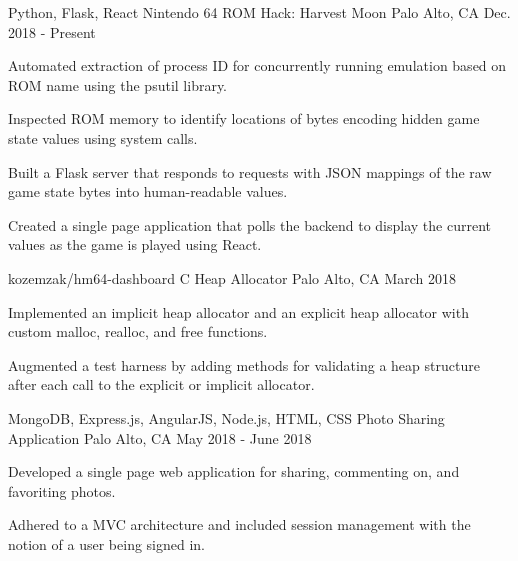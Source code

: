 
\begin{cventries}
  \cvprojectentry
    {Python, Flask, React}
    {Nintendo 64 ROM Hack: Harvest Moon}
    {Palo Alto, CA}
    {Dec. 2018 - Present}
    {
      \begin{cvitems}
        \item{Automated extraction of process ID for concurrently running emulation based on ROM name using the psutil library.}
        \item{Inspected ROM memory to identify locations of bytes encoding hidden game state values using system calls.}
        \item{Built a Flask server that responds to requests with JSON mappings of the raw game state bytes into human-readable values.}
        \item{Created a single page application that polls the backend to display the current values as the game is played using React.}
      \end{cvitems} 
    }
    {kozemzak/hm64-dashboard}
  \cvprojectentry
    {C}
    {Heap Allocator}
    {Palo Alto, CA}
    {March 2018}
    {
      \begin{cvitems}
        \item {Implemented an implicit heap allocator and an explicit heap allocator with custom malloc, realloc, and free functions.}
        \item {Augmented a test harness by adding methods for validating a heap structure after each call to the explicit or implicit allocator.}
      \end{cvitems}
    }
    {}
  \cvprojectentry
    {MongoDB, Express.js, AngularJS, Node.js, HTML, CSS}
    {Photo Sharing Application}
    {Palo Alto, CA}
    {May 2018 - June 2018}
    {
      \begin{cvitems}
        \item {Developed a single page web application for sharing, commenting on, and favoriting photos.}
        \item {Adhered to a MVC architecture and included session management with the notion of a user being signed in.}
      \end{cvitems} 
    }
    {}
\end{cventries}
